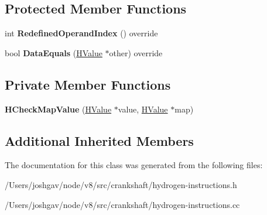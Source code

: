 \subsection*{Protected Member Functions}
\begin{DoxyCompactItemize}
\item 
int {\bfseries Redefined\+Operand\+Index} () override\hypertarget{classv8_1_1internal_1_1_h_check_map_value_a3c64a0d279ee54efaf1b8c2fd16178a4}{}\label{classv8_1_1internal_1_1_h_check_map_value_a3c64a0d279ee54efaf1b8c2fd16178a4}

\item 
bool {\bfseries Data\+Equals} (\hyperlink{classv8_1_1internal_1_1_h_value}{H\+Value} $\ast$other) override\hypertarget{classv8_1_1internal_1_1_h_check_map_value_a406439c02348bea55b0694970dfc50f4}{}\label{classv8_1_1internal_1_1_h_check_map_value_a406439c02348bea55b0694970dfc50f4}

\end{DoxyCompactItemize}
\subsection*{Private Member Functions}
\begin{DoxyCompactItemize}
\item 
{\bfseries H\+Check\+Map\+Value} (\hyperlink{classv8_1_1internal_1_1_h_value}{H\+Value} $\ast$value, \hyperlink{classv8_1_1internal_1_1_h_value}{H\+Value} $\ast$map)\hypertarget{classv8_1_1internal_1_1_h_check_map_value_a3f29e8c36f20746df1e6388ada7fd2f0}{}\label{classv8_1_1internal_1_1_h_check_map_value_a3f29e8c36f20746df1e6388ada7fd2f0}

\end{DoxyCompactItemize}
\subsection*{Additional Inherited Members}


The documentation for this class was generated from the following files\+:\begin{DoxyCompactItemize}
\item 
/\+Users/joshgav/node/v8/src/crankshaft/hydrogen-\/instructions.\+h\item 
/\+Users/joshgav/node/v8/src/crankshaft/hydrogen-\/instructions.\+cc\end{DoxyCompactItemize}
